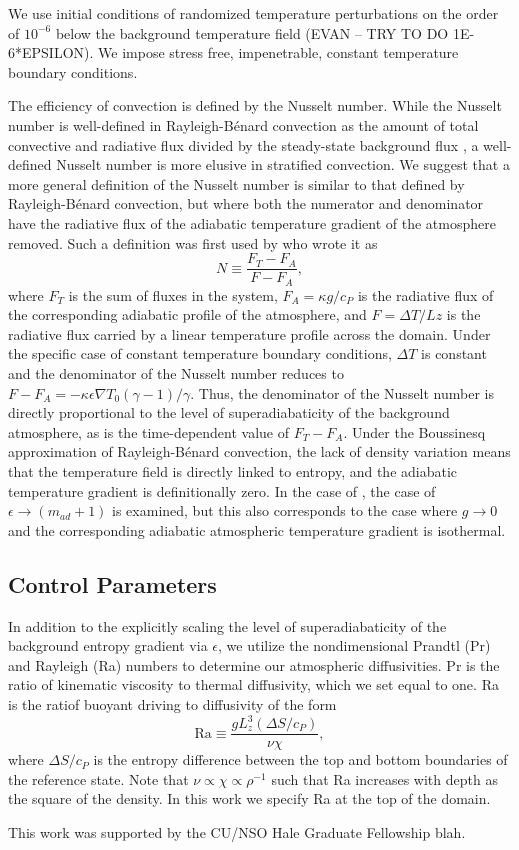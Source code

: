 \documentclass[aps, prl, twocolumn, groupedaddress]{revtex4-1}
\newcommand{\grad}{\ensuremath{\nabla}}
\newcommand{\RB}{Rayleigh-B\'{e}nard }
\begin{document}
We use initial conditions of randomized temperature perturbations on the order of $10^{-6}$ below the background
temperature field (EVAN -- TRY TO DO 1E-6*EPSILON). We impose stress free, impenetrable, constant temperature boundary
conditions.

The efficiency of convection is defined by the Nusselt number.  While the Nusselt number is well-defined in \RB convection
as the amount of total convective and radiative flux divided by the steady-state background flux \cite{johnston&doering2009, otero&all2002},
a well-defined Nusselt number is more elusive in stratified convection.  We suggest that a more general definition of the
Nusselt number is similar to that defined by \RB convection, but where both the numerator and denominator have the
radiative flux of the adiabatic temperature gradient of the atmosphere removed.  Such a definition was first used
by \cite{hurlburt&all1984} who wrote it as
\begin{equation}
N \equiv \frac{F_T - F_A}{F - F_A},
\end{equation}
where $F_T$ is the sum of fluxes in the system, $F_A = \kappa g / c_P$ is the radiative flux of the corresponding adiabatic profile
of the atmosphere, and $F = \Delta T / Lz$ is the radiative flux carried by a linear temperature profile across the domain.  Under
the specific case of constant temperature boundary conditions, $\Delta T$ is constant and the denominator of the Nusselt number
reduces to $F - F_A = -\kappa\epsilon \grad T_0 (\gamma-1)/\gamma$.  Thus, the denominator of the Nusselt number is directly proportional
to the level of superadiabaticity of the background atmosphere, as is the time-dependent value of $F_T - F_A$.  Under the Boussinesq
approximation of \RB convection, the lack of density variation means that the temperature field is directly linked to entropy, and
the adiabatic temperature gradient is definitionally zero.  In the case of \cite{brandenburg&all2005}, the case of
$\epsilon \rightarrow (m_{ad} + 1)$ is examined, but this also corresponds to the case where $g \rightarrow 0$ and the
corresponding adiabatic atmospheric temperature gradient is isothermal.

\subsection{Control Parameters}
In addition to the explicitly scaling the level of superadiabaticity of the background entropy gradient via $\epsilon$,
we utilize the nondimensional Prandtl (Pr) and Rayleigh (Ra) numbers to determine our atmospheric diffusivities.  Pr
is the ratio of kinematic viscosity to thermal diffusivity, which we set equal to one.  Ra is the ratiof buoyant driving
to diffusivity of the form
\begin{equation}
\text{Ra} \equiv \frac{g L_z^3 (\Delta S/c_P)}{\nu\chi},
	\label{eqn:ra_def}
\end{equation}
where $\Delta S/c_P$ is the entropy difference between the top and bottom boundaries of the reference state.  Note that
$\nu \propto \chi \propto \rho^{-1}$ such that Ra increases with depth as the square of the density.  In this work we
specify Ra at the top of the domain.

\begin{acknowledgements}
This work was supported by the CU/NSO Hale Graduate Fellowship blah.
\end{acknowledgements}


\end{document}
